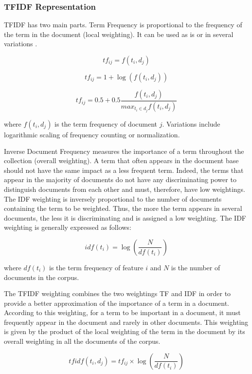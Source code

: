 \subsubsection*{TFIDF Representation}

TFIDF has two main parts. Term Frequency is proportional to the frequency of the term in the document (local weighting). It can be used as is or in several variations \citep{singhal1997learning} \citep{sable2001using}.

$$t f _ { i j } = f \left( t _ { i } , d _ { j } \right)$$

$$t f _ { i j } = 1 + \log \left( f \left( t _ { i } , d _ { j } \right) \right)$$

$$ t f _ { i j } = 0.5 + 0.5 \frac { f \left( t _ { i } , d _ { j } \right) } { m a x _ { t _ { i } \in d _ { j } } f \left( t _ { i } , d _ { j } \right) }$$

where $f(t_{i},d_{j})$ is the term frequency of document $j$. Variations include logarithmic scaling of frequency counting or normalization. 

Inverse Document Frequency measures the importance of a term throughout the collection (overall weighting). A term that often appears in the document base should not have the same impact as a less frequent term. Indeed, the terms that appear in the majority of documents do not have any discriminating power to distinguish documents from each other and must, therefore, have low weightings. The IDF weighting is inversely proportional to the number of documents containing the term to be weighted. Thus, the more the term appears in several documents, the less it is discriminating and is assigned a low weighting. The IDF weighting is generally expressed as follows:

$$i d f \left( t _ { i } \right) = \log \left( \frac { N } { d f \left( t _ { i } \right) } \right)$$

where $df(t_{i})$ is the term frequency of feature $i$ and $N$ is the number of documents in the corpus.

The TFIDF weighting combines the two weightings TF and IDF in order to
provide a better approximation of the importance of a term in a
document. According to this weighting, for a term to be important in a
document, it must frequently appear in the document and rarely in other
documents. This weighting is given by the product of the local weighting
of the term in the document by its overall weighting in all the
documents of the corpus.

$$t f i d f \left( t _ { i } , d _ { j } \right) = t f _ { i j } \times \log \left( \frac { N } { d f \left( t _ { i } \right) } \right)$$

